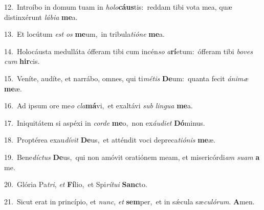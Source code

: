 {\numbfont\textcolor{\numbcolor}{12.}}~Introíbo in domum tuam in \textit{ho}\-\textit{lo}\textbf{cáus}tis:~\star reddam tibi vota mea, quæ distinxérunt \textit{lá}\-\textit{bi}\textit{a} \textbf{me}\-a.\par
{\numbfont\textcolor{\numbcolor}{13.}}~Et locútum \textit{est} \textit{os} \textbf{me}\-um,~\star in tribula\-\textit{ti}\-\textit{ó}\textit{ne} \textbf{me}\-a.\par
{\numbfont\textcolor{\numbcolor}{14.}}~Holocáusta medulláta ófferam tibi cum incén\textit{so} \textit{a}\-\textbf{rí}etum:~\star ófferam tibi \textit{bo}\-\textit{ves} \textit{cum} \textbf{hir}\-cis.\par
{\numbfont\textcolor{\numbcolor}{15.}}~Veníte, audíte, et narrábo, omnes, qui ti\-\textit{mé}\-\textit{tis} \textbf{De}\-um:~\star quanta fecit \textit{á}\-\textit{ni}\textit{mæ} \textbf{me}\-æ.\par
{\numbfont\textcolor{\numbcolor}{16.}}~Ad ipsum ore me\textit{o} \textit{cla}\-\textbf{má}vi,~\star et exaltávi \textit{sub} \textit{lin}\-\textit{gua} \textbf{me}\-a.\par
{\numbfont\textcolor{\numbcolor}{17.}}~Iniquitátem si aspéxi in \textit{cor}\-\textit{de} \textbf{me}\-o,~\star non ex\-\textit{áu}\-\textit{di}\textit{et} \textbf{Dó}\-minus.\par
{\numbfont\textcolor{\numbcolor}{18.}}~Proptérea exau\-\textit{dí}\-\textit{vit} \textbf{De}\-us,~\star et atténdit voci depreca\-\textit{ti}\-\textit{ó}\textit{nis} \textbf{me}\-æ.\par
{\numbfont\textcolor{\numbcolor}{19.}}~Bene\-\textit{díc}\-\textit{tus} \textbf{De}\-us,~\star qui non amóvit oratiónem meam, et misericórdi\textit{am} \textit{su}\-\textit{am} \textbf{a} me.\par
{\numbfont\textcolor{\numbcolor}{20.}}~Glória Pa\-\textit{tri}\-, \textit{et} \textbf{Fí}\-lio,~\star et Spi\-\textit{rí}\-\textit{tu}\textit{i} \textbf{Sanc}\-to.\par
{\numbfont\textcolor{\numbcolor}{21.}}~Sicut erat in princípio, et \textit{nunc}\-, \textit{et} \textbf{sem}\-per,~\star et in sǽcula sæ\-\textit{cu}\-\textit{ló}\textit{rum}. \textbf{A}\-men.\par
